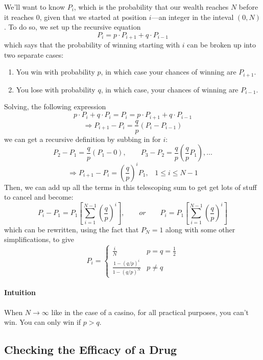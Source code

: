 \documentclass[a4paper,12pt]{scrartcl}
\begin{document}
We'll want to know $P_i$, which is the probability that our 
wealth reaches $N$ before it reaches $0$, given that we started
at position $i$---an integer in the inteval $(0,N)$. To do so, 
we set up the recursive equation
   \[ P_i = p \cdot P_{i+1} + q \cdot P_{i-1} \]
which says that the probability of winning starting with $i$ can be 
broken up into two separate cases:
\begin{enumerate}
   \item{You win with probability $p$, in which case your chances of
      winning are $P_{i+1}$.}
   \item{You lose with probability $q$, in which case, your chances of
      winning are $P_{i-1}$.}
\end{enumerate}
Solving, the following expression
   \[p\cdot P_i+q\cdot P_i = P_i = p \cdot P_{i+1} + q \cdot P_{i-1} \]
   \[ \Rightarrow P_{i+1} - P_i = \frac{q}{p}(P_i - P_{i-1}) \]
we can get a recursive definition by subbing in for $i$:
   \[ P_2 - P_1 = \frac{q}{p} (P_1 - 0), \qquad 
      P_3 - P_2 = \frac{q}{p}\left(\frac{q}{p} P_1\right), \ldots \]
   \[ \Rightarrow P_{i+1} - P_i = \left(\frac{q}{p}\right)^{i} P_1, 
      \;\;\; 1\leq i\leq N-1 \]
Then, we can add up all the terms in this telescoping sum to get get 
lots of stuff to cancel and become:
   \[ P_i - P_1 = P_1 \left[ \sum_{i=1}^{N-1} \left(\frac{q}{p}\right)^i
      \right], \qquad or \qquad 
      P_i = P_1 \left[ \sum_{i=1}^{N-1} \left(\frac{q}{p}\right)^i
      \right] \]
which can be rewritten, using the fact that $P_N = 1$ along with 
some other simplifications, to give
   \[ P_i = \begin{cases} \frac{i}{N} & p=q=\frac{1}{2} \\
      \frac{1-\left( q/p \right)^i}{1-\left(q/p\right)^N} 
      & p \neq q \end{cases}
      \]

\paragraph{Intuition} When $N\rightarrow \infty$ like in the case of a
casino, for all practical purposes, you can't win.  You can only
win if $p > q$.

\subsection{Checking the Efficacy of a Drug}
\end{document}
